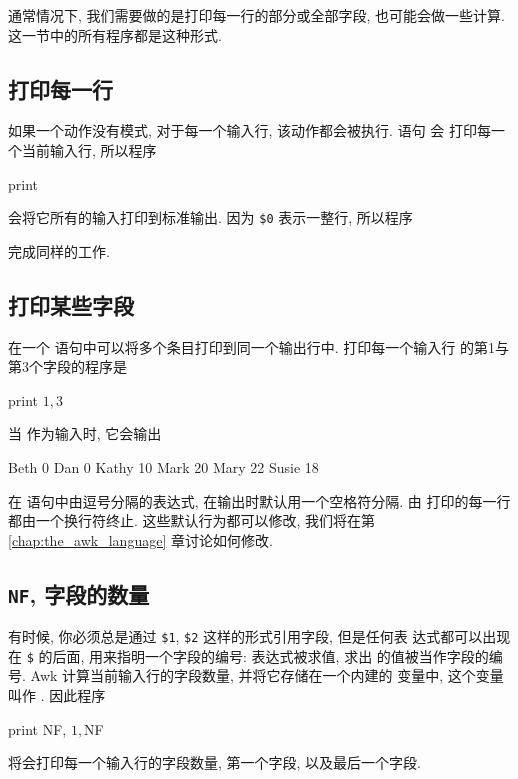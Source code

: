 通常情况下, 我们需要做的是打印每一行的部分或全部字段, 也可能会做一些计算.
这一节中的所有程序都是这种形式.

\subsection{打印每一行}
\label{subsec:printing_every_line}

如果一个动作没有模式, 对于每一个输入行, 该动作都会被执行. 语句 \print 会
打印每一个当前输入行, 所以程序
\begin{awkcode}
    { print }
\end{awkcode}
会将它所有的输入打印到标准输出. 因为 \verb'$0' 表示一整行, 所以程序
完成同样的工作.

\subsection{打印某些字段}
\label{subsec:printing_certain_fields}

在一个 \print 语句中可以将多个条目打印到同一个输出行中. 打印每一个输入行
的第1与第3个字段的程序是
\begin{awkcode}
    { print $1, $3 }
\end{awkcode}
当  作为输入时, 它会输出
\begin{file}
    Beth 0
    Dan 0
    Kathy 10
    Mark 20
    Mary 22
    Susie 18
\end{file}
在 \print 语句中由逗号分隔的表达式, 在输出时默认用一个空格符分隔. 由
\print 打印的每一行都由一个换行符终止. 这些默认行为都可以修改, 我们将在第
\ref{chap:the_awk_language} 章讨论如何修改.

\subsection{\texttt{NF}, 字段的数量}
\label{subsec:nf_the_number_fields}

有时候, 你必须总是通过 \verb'$1', \verb'$2' 这样的形式引用字段, 但是任何表
达式都可以出现在 \verb'$' 的后面, 用来指明一个字段的编号: 表达式被求值, 求出
的值被当作字段的编号. Awk 计算当前输入行的字段数量, 并将它存储在一个内建的
变量中, 这个变量叫作 \nf. 因此程序
\begin{awkcode}
    { print NF, $1, $NF }
\end{awkcode}
将会打印每一个输入行的字段数量, 第一个字段, 以及最后一个字段.

